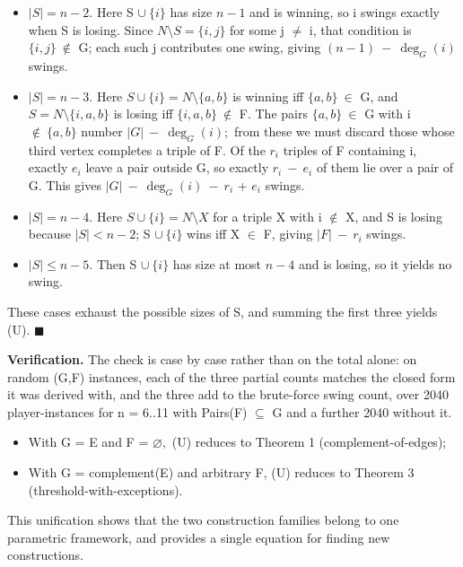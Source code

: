 \documentclass[
]{article}
\providecommand{\tightlist}{%
  \setlength{\itemsep}{0pt}\setlength{\parskip}{0pt}}
\begin{document}
\begin{itemize}
\tightlist
\item
  \(|S| = n-2\). Here S \(\cup\ \{i\}\) has size \(n-1\) and is winning,
  so i swings exactly when S is losing. Since
  \(N \setminus S = \{i,j\}\) for some j \(\ne\) i, that condition is
  \(\{i,j\}\ \notin\) G; each such j contributes one swing, giving
  \((n-1)\ -\ \deg_G(i)\) swings.
\item
  \(|S| = n-3\). Here \(S \cup \{i\} = N\setminus\{a,b\}\) is winning
  iff \(\{a,b\}\ \in\) G, and \(S = N\setminus\{i,a,b\}\) is losing iff
  \(\{i,a,b\}\ \notin\) F. The pairs \(\{a,b\}\ \in\) G with i
  \(\notin\ \{a,b\}\) number \(\vert G\vert\ -\ \deg_G(i);\) from these
  we must discard those whose third vertex completes a triple of F. Of
  the \(r_i\) triples of F containing i, exactly \(e_i\) leave a pair
  outside G, so exactly \(r_i\ -\ e_i\) of them lie over a pair of G.
  This gives \(\vert G\vert\ -\ \deg_G(i)\ -\ r_i\) + \(e_i\) swings.
\item
  \(|S| = n-4\). Here \(S \cup \{i\} = N\setminus X\) for a triple X
  with i \(\notin\) X, and S is losing because \(|S| < n-2\); S
  \(\cup\ \{i\}\) wins iff X \(\in\) F, giving \(\vert F\vert\ -\ r_i\)
  swings.
\item
  \(|S| \le n-5\). Then S \(\cup\ \{i\}\) has size at most \(n-4\) and
  is losing, so it yields no swing.
\end{itemize}

These cases exhaust the possible sizes of S, and summing the first three
yields (U). \(\blacksquare\)

\textbf{Verification.} The check is case by case rather than on the
total alone: on random (G,F) instances, each of the three partial counts
matches the closed form it was derived with, and the three add to the
brute-force swing count, over 2040 player-instances for n = 6..11 with
Pairs(F) \(\subseteq\) G and a further 2040 without it.

\begin{itemize}
\tightlist
\item
  With G = E and F = \(\varnothing,\) (U) reduces to Theorem 1
  (complement-of-edges);
\item
  With G = complement(E) and arbitrary F, (U) reduces to Theorem 3
  (threshold-with-exceptions).
\end{itemize}

This unification shows that the two construction families belong to one
parametric framework, and provides a single equation for finding new
constructions.
\end{document}
